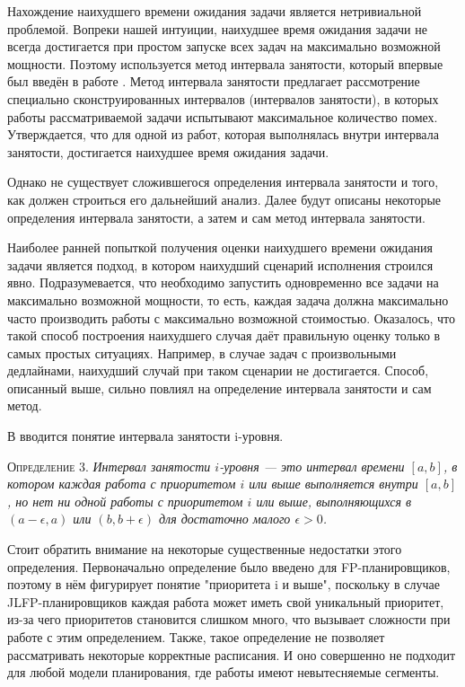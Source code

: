 Нахождение наихудшего времени ожидания задачи является нетривиальной проблемой. Вопреки нашей
  интуиции, наихудшее время ожидания задачи не всегда достигается при простом запуске
  всех задач на максимально возможной мощности. Поэтому используется метод интервала занятости, который впервые был
  введён в работе \cite{Lehoczky1990FixedPS}. Метод интервала занятости предлагает
  рассмотрение специально сконструированных интервалов (интервалов занятости), в
  которых работы рассматриваемой задачи испытывают максимальное количество помех.
  Утверждается, что для одной из работ, которая выполнялась внутри интервала занятости,
  достигается наихудшее время ожидания задачи.

Однако не существует сложившегося определения интервала занятости и того, как должен
  строиться его дальнейший анализ. Далее будут описаны некоторые определения
  интервала занятости, а затем и сам метод интервала занятости.

Наиболее ранней попыткой получения оценки наихудшего времени ожидания задачи
  является подход, в котором наихудший сценарий исполнения строился явно.
  Подразумевается, что необходимо запустить одновременно все задачи на максимально возможной мощности,
  то есть, каждая задача должна максимально часто производить работы с максимально
  возможной стоимостью. Оказалось, что такой способ построения наихудшего случая
  даёт правильную оценку только в самых простых ситуациях. Например, в случае задач
  с произвольными дедлайнами, наихудший случай при таком сценарии не достигается.
  Способ, описанный выше, сильно повлиял на определение интервала занятости
  и сам метод.

В \cite{Lehoczky1990FixedPS} вводится понятие интервала занятости i-уровня.

\textsc{Определение 3.}
\textit{Интервал занятости $i$-уровня --- это интервал времени $[a,b]$, в котором каждая
  работа с приоритетом $i$ или выше выполняется внутри $[a,b]$, но нет ни одной работы
  с приоритетом $i$ или выше, выполняющихся в $(a - \epsilon, a)$ или $(b, b + \epsilon)$
  для достаточно малого $\epsilon > 0$.
}

Стоит обратить внимание на некоторые существенные недостатки этого определения.
  Первоначально определение было введено для FP-планировщиков, поэтому
  в нём фигурирует понятие "приоритета i и выше", поскольку в случае JLFP-планировщиков каждая
  работа может иметь свой уникальный приоритет, из-за чего приоритетов становится
  слишком много, что вызывает сложности при работе с этим определением. Также, такое
  определение не позволяет рассматривать некоторые корректные расписания. И оно совершенно
  не подходит для любой модели планирования, где работы имеют невытесняемые сегменты.

